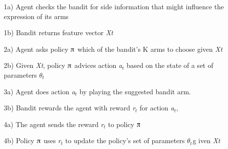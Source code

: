 \documentclass[nojss]{jss}\usepackage[]{graphicx}\usepackage[]{color}
\begin{document}
\begin{enumerate}
         \item[1a)] Agent checks the bandit for side information that might influence the expression of its arms
         \item[1b)] Bandit returns feature vector \textit{Xt }
         \item[2a)] Agent asks policy $\piup$ which of the bandit's K arms to choose given \textit{Xt}
         \item[2b)] Given \textit{Xt}, policy $\piup$ advices action \textit{a${}_{t}$} based on the state of a set of parameters \textit{$\theta$${}_{t}$${}_{  }$}
         \item[3a)] Agent does action \textit{a${}_{t}$} by playing the suggested bandit arm.
         \item[3b)] Bandit rewards the agent with reward \textit{r${}_{t}$ }for action \textit{a${}_{t}$},
         \item[4a)] The agent sends the reward\textit{ r${}_{t}$ }to policy $\piup$
         \item[4b)] Policy $\piup$ uses \textit{r${}_{t}$} to update the policy's set of parameters\textit{ $\theta$${}_{t}$${}_{  }$}g iven \textit{Xt}
\end{enumerate}
\end{document}
